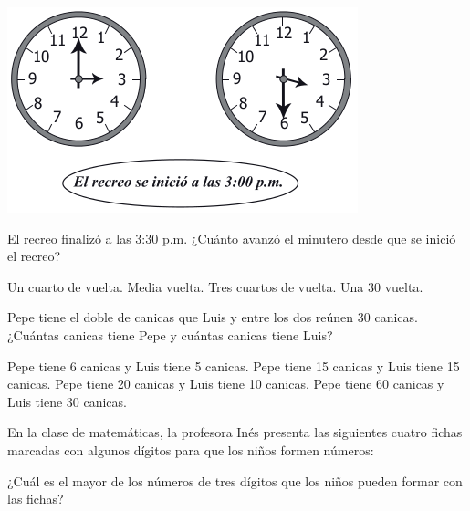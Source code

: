 \documentclass[10pt,letterpaper,addpoints]{exam}
\begin{document}
\begin{multicols}{2}
\begin{center}
 \includegraphics[scale=.55]{Images/relojes.png}
 \end{center} 
\begin{questions}
\question El recreo finalizó a las 3:30 p.m. ¿Cuánto avanzó el minutero desde que se inició el recreo?
\begin{choices}
\choice Un cuarto de vuelta.
\CorrectChoice Media vuelta.
\choice Tres cuartos de vuelta.
\choice Una 30 vuelta.
\end{choices}
\question Pepe tiene el doble de canicas que Luis y entre los dos reúnen 30 canicas. ¿Cuántas canicas tiene Pepe y cuántas canicas tiene Luis?
\begin{choices}
\choice Pepe tiene 6 canicas y Luis tiene 5 canicas.
\choice Pepe tiene 15 canicas y Luis tiene 15 canicas.
\CorrectChoice Pepe tiene 20 canicas y Luis tiene 10 canicas.
\choice Pepe tiene 60 canicas y Luis tiene 30 canicas.
\end{choices}
\question En la clase de matemáticas, la profesora Inés presenta las siguientes cuatro fichas marcadas con algunos dígitos para que los niños formen números:
\begin{center}
\end{center}
¿Cuál es el mayor de los números de tres dígitos que los niños pueden formar con las fichas?
\begin{multicols}{2}
\begin{choices}
\end{choices}
\end{multicols}
\end{questions}
\end{multicols}
\end{document}
